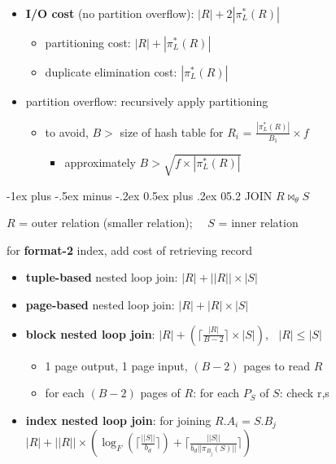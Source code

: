 \documentclass[10pt, landscape]{article}
\makeatletter
\renewcommand{\section}{\@startsection{section}{1}{0mm}%
  {-1ex plus -.5ex minus -.2ex}%
  {0.5ex plus .2ex}%
{\normalfont\large\bfseries}}
\makeatother
\begin{document}
\begin{multicols*}{4}
  \begin{itemize}
    \item \textbf{I/O cost} (no partition overflow): $|R| + 2|\pi^*_L(R)|$
      \begin{itemize}
        \item partitioning cost: $|R| + |\pi^*_L(R)|$
        \item duplicate elimination cost: $|\pi^*_L(R)|$
      \end{itemize}
    \item partition overflow: recursively apply partitioning
      \begin{itemize}
        \item to avoid, $B>$ size of hash table for $R_i$ = $\frac{|\pi^*_L(R)|}{B_1} \times f$
          \begin{itemize}
            \item  approximately $B> \sqrt{f\times |\pi^*_L(R)|}$
          \end{itemize}
      \end{itemize}
  \end{itemize}

  \section{05.2 JOIN $R \bowtie_\theta S$}

  $R$ = outer relation (smaller relation); $\quad S$ = inner relation

  \attention for \textbf{format-2} index, add cost of retrieving record

  \begin{itemize}
    \item \textbf{tuple-based} nested loop join: $|R| + ||R|| \times |S|$
    \item \textbf{page-based} nested loop join: $|R| + |R| \times |S|$
    \item \textbf{block nested loop join}: $|R| + ( \lceil \frac{|R|}{B-2} \rceil \times |S| )$, $\;\; |R|\leq|S|$
      \begin{itemize}
        \item 1 page output, 1 page input, $(B-2)$ pages to read $R$
        \item for each $(B-2)$ pages of $R$: for each $P_S$ of $S$: check r,s
      \end{itemize}
    \item \textbf{index nested loop join}: for joining $R.A_i = S.B_j$
      $|R| + ||R|| \times \left( \log_F(\lceil \frac{||S||}{b_d} \rceil ) + \lceil \frac{||S||}{b_d ||\pi_{B_j}(S)||} \rceil \right)$
  \end{itemize}


\end{multicols*}
\end{document}

